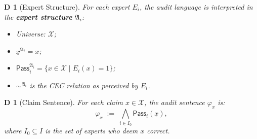 \documentclass[12pt,a4paper]{article}
\newtheorem{definition}[theorem]Definition
\theoremstyle{remark}
\newcommand{\ClaimSpace}{\mathcal{X}}
\newcommand{\Struct}{\mathfrak{A}}
\begin{document}
\begin{definition}[Expert Structure]
For each expert \(E_i\), the audit language is interpreted in the \textbf{expert structure} \(\Struct_i\):
\begin{itemize}[itemsep=2pt]
    \item Universe: \(\ClaimSpace\);
    \item \(\underline{x}^{\Struct_i} = x\);
    \item \(\mathsf{Pass}_i^{\Struct_i} = \{x \in \ClaimSpace \mid E_i(x) = 1\}\);
    \item \(\sim^{\Struct_i}\) is the CEC relation as perceived by \(E_i\).
\end{itemize}
\end{definition}

\begin{definition}[Claim Sentence]
For each claim \(x \in \ClaimSpace\), the audit sentence \(\varphi_x\) is:
\begin{equation}
    \varphi_x \;:=\; \bigwedge_{i \in I_0} \mathsf{Pass}_i(\underline{x}),
\end{equation}
where \(I_0 \subseteq I\) is the set of experts who deem \(x\) correct.
\end{definition}
\end{document}
